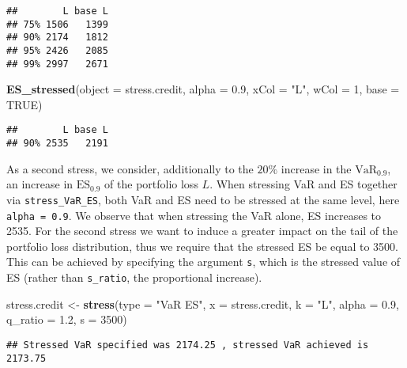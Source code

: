 \documentclass[
]{article}
\newenvironment{Shaded}{\begin{snugshade}}{\end{snugshade}}
\newcommand{\DataTypeTok}[1]{\textcolor[rgb]{0.13,0.29,0.53}{#1}}
\newcommand{\DecValTok}[1]{\textcolor[rgb]{0.00,0.00,0.81}{#1}}
\newcommand{\FloatTok}[1]{\textcolor[rgb]{0.00,0.00,0.81}{#1}}
\newcommand{\KeywordTok}[1]{\textcolor[rgb]{0.13,0.29,0.53}{\textbf{#1}}}
\newcommand{\NormalTok}[1]{#1}
\newcommand{\OtherTok}[1]{\textcolor[rgb]{0.56,0.35,0.01}{#1}}
\newcommand{\StringTok}[1]{\textcolor[rgb]{0.31,0.60,0.02}{#1}}
\begin{document}
\begin{verbatim}
##        L base L
## 75% 1506   1399
## 90% 2174   1812
## 95% 2426   2085
## 99% 2997   2671
\end{verbatim}

\begin{Shaded}
\begin{Highlighting}[]
\KeywordTok{ES_stressed}\NormalTok{(}\DataTypeTok{object =}\NormalTok{ stress.credit, }\DataTypeTok{alpha =} \FloatTok{0.9}\NormalTok{, }\DataTypeTok{xCol =} \StringTok{"L"}\NormalTok{, }\DataTypeTok{wCol =} \DecValTok{1}\NormalTok{, }
    \DataTypeTok{base =} \OtherTok{TRUE}\NormalTok{)}
\end{Highlighting}
\end{Shaded}

\begin{verbatim}
##        L base L
## 90% 2535   2191
\end{verbatim}

As a second stress, we consider, additionally to the \(20\%\) increase in the \(\text{VaR}_{0.9}\), an increase in \(\text{ES}_{0.9}\) of the portfolio loss \(L\). When stressing VaR and ES together via \texttt{stress\_VaR\_ES}, both VaR and ES need to be stressed at the same level, here \texttt{alpha\ =\ 0.9}. We observe that when stressing the VaR alone, ES increases to 2535. For the second stress we want to induce a greater impact on the tail of the portfolio loss distribution, thus we require that the stressed ES be equal to 3500. This can be achieved by specifying the argument \texttt{s}, which is the stressed value of ES (rather than \texttt{s\_ratio}, the proportional increase).

\begin{Shaded}
\begin{Highlighting}[]
\NormalTok{stress.credit <-}\StringTok{ }\KeywordTok{stress}\NormalTok{(}\DataTypeTok{type =} \StringTok{"VaR ES"}\NormalTok{, }\DataTypeTok{x =}\NormalTok{ stress.credit, }\DataTypeTok{k =} \StringTok{"L"}\NormalTok{, }\DataTypeTok{alpha =} \FloatTok{0.9}\NormalTok{, }
    \DataTypeTok{q_ratio =} \FloatTok{1.2}\NormalTok{, }\DataTypeTok{s =} \DecValTok{3500}\NormalTok{)}
\end{Highlighting}
\end{Shaded}

\begin{verbatim}
## Stressed VaR specified was 2174.25 , stressed VaR achieved is 2173.75
\end{verbatim}
\end{document}
